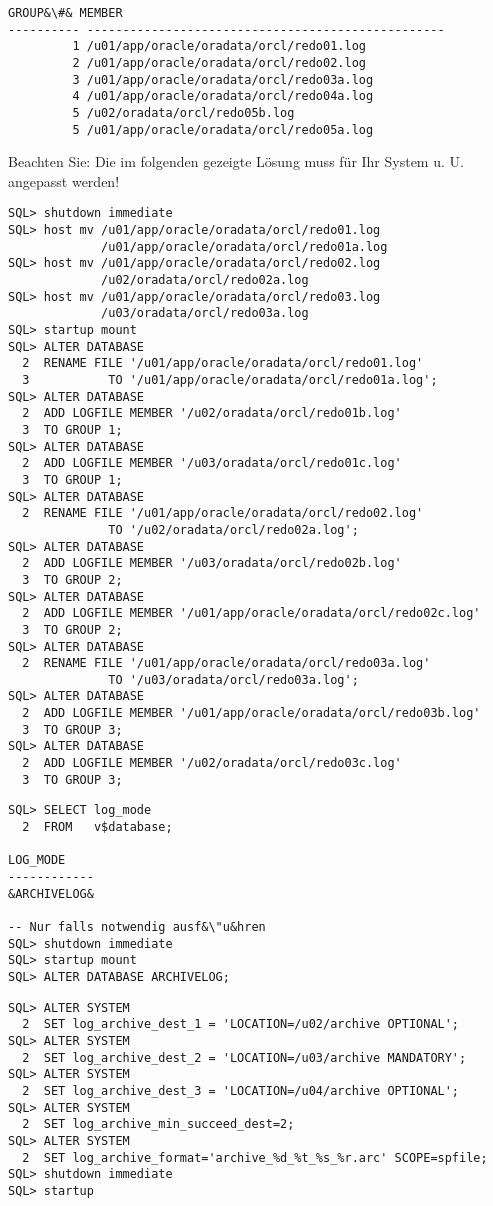 \begin{enumerate}
\begin{lstlisting}[language=oracle_sql,alsolanguage=sqlplus]
    GROUP&\#& MEMBER
---------- --------------------------------------------------
         1 /u01/app/oracle/oradata/orcl/redo01.log
         2 /u01/app/oracle/oradata/orcl/redo02.log
         3 /u01/app/oracle/oradata/orcl/redo03a.log
         4 /u01/app/oracle/oradata/orcl/redo04a.log
         5 /u02/oradata/orcl/redo05b.log
         5 /u01/app/oracle/oradata/orcl/redo05a.log
        \end{lstlisting}
\clearpage
      
        Beachten Sie: Die im folgenden gezeigte L\"osung muss f\"ur Ihr System u. U. angepasst werden!
        \begin{lstlisting}[language=oracle_sql,alsolanguage=sqlplus]
SQL> shutdown immediate
SQL> host mv /u01/app/oracle/oradata/orcl/redo01.log
             /u01/app/oracle/oradata/orcl/redo01a.log
SQL> host mv /u01/app/oracle/oradata/orcl/redo02.log
             /u02/oradata/orcl/redo02a.log
SQL> host mv /u01/app/oracle/oradata/orcl/redo03.log
             /u03/oradata/orcl/redo03a.log
SQL> startup mount
SQL> ALTER DATABASE
  2  RENAME FILE '/u01/app/oracle/oradata/orcl/redo01.log'
  3           TO '/u01/app/oracle/oradata/orcl/redo01a.log';
SQL> ALTER DATABASE
  2  ADD LOGFILE MEMBER '/u02/oradata/orcl/redo01b.log'
  3  TO GROUP 1;
SQL> ALTER DATABASE
  2  ADD LOGFILE MEMBER '/u03/oradata/orcl/redo01c.log'
  3  TO GROUP 1;
SQL> ALTER DATABASE
  2  RENAME FILE '/u01/app/oracle/oradata/orcl/redo02.log'
              TO '/u02/oradata/orcl/redo02a.log';
SQL> ALTER DATABASE
  2  ADD LOGFILE MEMBER '/u03/oradata/orcl/redo02b.log'
  3  TO GROUP 2;
SQL> ALTER DATABASE
  2  ADD LOGFILE MEMBER '/u01/app/oracle/oradata/orcl/redo02c.log'
  3  TO GROUP 2;
SQL> ALTER DATABASE
  2  RENAME FILE '/u01/app/oracle/oradata/orcl/redo03a.log'
              TO '/u03/oradata/orcl/redo03a.log';
SQL> ALTER DATABASE
  2  ADD LOGFILE MEMBER '/u01/app/oracle/oradata/orcl/redo03b.log'
  3  TO GROUP 3;
SQL> ALTER DATABASE
  2  ADD LOGFILE MEMBER '/u02/oradata/orcl/redo03c.log'
  3  TO GROUP 3;
        \end{lstlisting}
\clearpage
      
        \begin{lstlisting}[language=oracle_sql,alsolanguage=sqlplus]
SQL> SELECT log_mode
  2  FROM   v$database;

LOG_MODE
------------
&ARCHIVELOG&

-- Nur falls notwendig ausf&\"u&hren
SQL> shutdown immediate
SQL> startup mount
SQL> ALTER DATABASE ARCHIVELOG;
        \end{lstlisting}
      
        \begin{lstlisting}[language=oracle_sql,alsolanguage=sqlplus]
SQL> ALTER SYSTEM
  2  SET log_archive_dest_1 = 'LOCATION=/u02/archive OPTIONAL';
SQL> ALTER SYSTEM
  2  SET log_archive_dest_2 = 'LOCATION=/u03/archive MANDATORY';
SQL> ALTER SYSTEM
  2  SET log_archive_dest_3 = 'LOCATION=/u04/archive OPTIONAL';
SQL> ALTER SYSTEM
  2  SET log_archive_min_succeed_dest=2;
SQL> ALTER SYSTEM
  2  SET log_archive_format='archive_%d_%t_%s_%r.arc' SCOPE=spfile;
SQL> shutdown immediate
SQL> startup
        \end{lstlisting}
    \end{enumerate}
\clearpage
